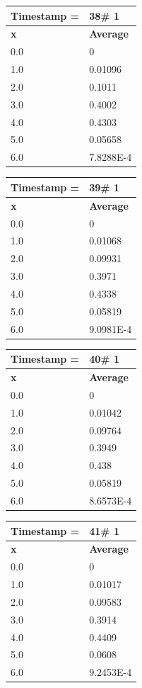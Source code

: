\begin{tabular}{|l||l|}
\hline
\textbf{Timestamp =} & \textbf{38}\# 1\\\hline
	\textbf{x} & \textbf{Average} \\ \hline
\hline
	0.0 & 0 \\ \hline
	1.0 & 0.01096 \\ \hline
	2.0 & 0.1011 \\ \hline
	3.0 & 0.4002 \\ \hline
	4.0 & 0.4303 \\ \hline
	5.0 & 0.05658 \\ \hline
	6.0 & 7.8288E-4 \\ \hline
\end{tabular}
\begin{tabular}{|l||l|}
\hline
\textbf{Timestamp =} & \textbf{39}\# 1\\\hline
	\textbf{x} & \textbf{Average} \\ \hline
\hline
	0.0 & 0 \\ \hline
	1.0 & 0.01068 \\ \hline
	2.0 & 0.09931 \\ \hline
	3.0 & 0.3971 \\ \hline
	4.0 & 0.4338 \\ \hline
	5.0 & 0.05819 \\ \hline
	6.0 & 9.0981E-4 \\ \hline
\end{tabular}

\begin{tabular}{|l||l|}
\hline
\textbf{Timestamp =} & \textbf{40}\# 1\\\hline
	\textbf{x} & \textbf{Average} \\ \hline
\hline
	0.0 & 0 \\ \hline
	1.0 & 0.01042 \\ \hline
	2.0 & 0.09764 \\ \hline
	3.0 & 0.3949 \\ \hline
	4.0 & 0.438 \\ \hline
	5.0 & 0.05819 \\ \hline
	6.0 & 8.6573E-4 \\ \hline
\end{tabular}
\begin{tabular}{|l||l|}
\hline
\textbf{Timestamp =} & \textbf{41}\# 1\\\hline
	\textbf{x} & \textbf{Average} \\ \hline
\hline
	0.0 & 0 \\ \hline
	1.0 & 0.01017 \\ \hline
	2.0 & 0.09583 \\ \hline
	3.0 & 0.3914 \\ \hline
	4.0 & 0.4409 \\ \hline
	5.0 & 0.0608 \\ \hline
	6.0 & 9.2453E-4 \\ \hline
\end{tabular}

